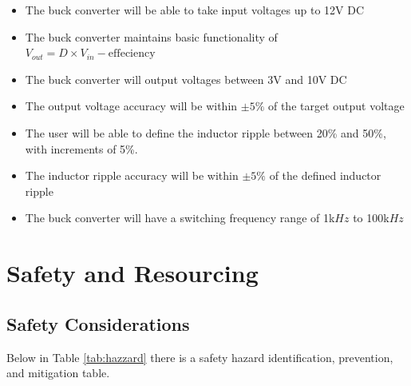 \documentclass[11pt, a4paper, oneside]{report}
\begin{document}
\begin{itemize}
	\item The buck converter will be able to take input voltages up to 12V DC
	
	\item The buck converter maintains basic functionality of $V_{out} = D\times V_{in} - \mathrm{effeciency}$

	\item The buck converter will output voltages between 3V and 10V DC
	
	\item The output voltage accuracy will be within $\pm 5\%$ of the target output voltage

	\item The user will be able to define the inductor ripple between 20\% and 50\%, with increments of 5\%.
	
	\item The inductor ripple accuracy will be within $\pm 5\%$ of the defined inductor ripple
	
	\item The buck converter will have a switching frequency range of 1k$Hz$ to 100k$Hz$
\end{itemize}

\section{Safety and Resourcing}

\subsection{Safety Considerations}

Below in Table \ref{tab:hazzard} there is a safety hazard identification, prevention, and mitigation table.
\end{document}
